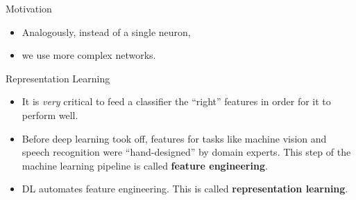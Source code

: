 \begin{vbframe}{Motivation}
\begin{itemize}
\item Analogously, instead of a single neuron, 
\begin{figure}
\centering
{}
\end{figure}
\item we use more complex networks.
\begin{figure}
\centering
{}
\end{figure}
\end{itemize}
\end{vbframe}

\begin{vbframe} {Representation Learning}
  \begin{itemize}
    \vspace{5mm}
    \item It is %
    \textit{very} critical to feed a classifier the \enquote{right} features in order for it to perform well.
    \vspace{7mm}
    \item Before deep learning took off, features for tasks like machine vision and speech recognition were \enquote{hand-designed} by domain experts. This step of the machine learning pipeline is called \textbf{feature engineering}.
    \vspace{7mm}
    \item %
     DL %
    automates feature engineering. This is called \textbf{representation learning}.
  \end{itemize}
\end{vbframe}

